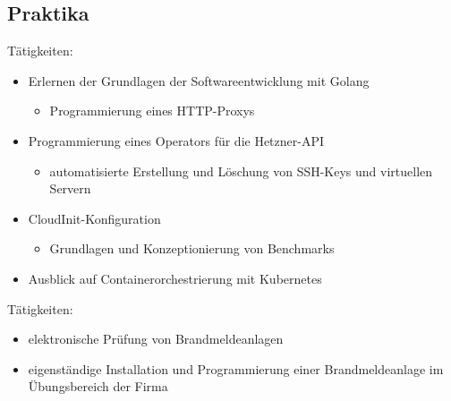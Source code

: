 \documentclass[11pt,a4paper,sans]{moderncv}        %
\begin{document}
\subsection{Praktika}
\begin{adjustwidth}{6.5em}{1cm}
Tätigkeiten:
\begin{itemize}
\setlength\itemsep{0.05em}
\item Erlernen der Grundlagen der Softwareentwicklung mit Golang
  \begin{itemize}
  \item Programmierung eines HTTP-Proxys
  \end{itemize}
\item Programmierung eines Operators für die Hetzner-API
  \begin{itemize}
  \item automatisierte Erstellung und Löschung von SSH-Keys und virtuellen Servern
  \end{itemize}
\item CloudInit-Konfiguration
  \begin{itemize}
  \item Grundlagen und Konzeptionierung von Benchmarks
  \end{itemize}
  \item Ausblick auf Containerorchestrierung mit Kubernetes
\end{itemize}
\end{adjustwidth}
\vspace{0.5\baselineskip}
\begin{adjustwidth}{6.5em}{1cm}
Tätigkeiten:
\begin{itemize}
  \setlength\itemsep{0.05em}
  \item elektronische Prüfung von Brandmeldeanlagen
  \item eigenständige Installation und Programmierung einer Brandmeldeanlage im Übungsbereich der Firma
\end{itemize}
\end{adjustwidth}
%
\end{document}
